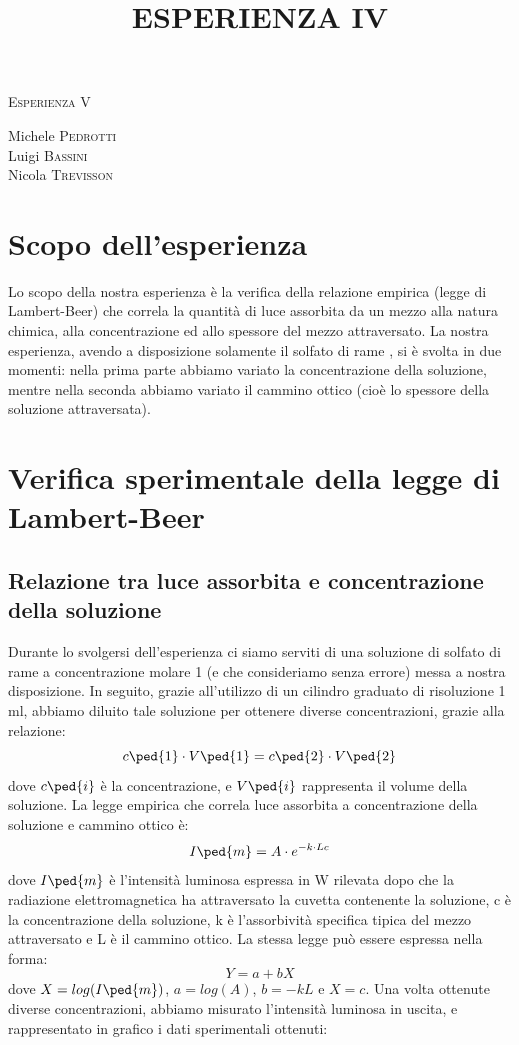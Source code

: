 \documentclass[a4paper,11pt]{article}
\begin{document}
\begin{center}



\textsc{\Huge Esperienza V}\\[0.5cm]



\large
\title{ESPERIENZA IV}

Michele \textsc{Pedrotti}\\
Luigi \textsc{Bassini}\\
Nicola \textsc{Trevisson}\\


\end{center}
\vspace{0.1 cm}
\section{Scopo dell'esperienza}
 Lo scopo della nostra esperienza è la verifica della relazione empirica (legge di Lambert-Beer) che correla la quantità di luce assorbita da un mezzo alla natura chimica, alla concentrazione ed allo spessore del mezzo attraversato. La nostra esperienza, avendo a disposizione solamente il solfato di rame , si è svolta in due momenti: nella prima parte abbiamo variato la concentrazione della soluzione, mentre nella seconda abbiamo variato il cammino ottico (cioè lo spessore della soluzione attraversata).

\section{Verifica sperimentale della legge di Lambert-Beer}
\subsection{Relazione tra luce assorbita e concentrazione della soluzione}
Durante lo svolgersi dell'esperienza ci siamo serviti di una soluzione di solfato di rame a concentrazione molare 1 (e che consideriamo senza errore) messa a nostra disposizione. In seguito, grazie all'utilizzo di un cilindro graduato di risoluzione 1 ml, abbiamo diluito tale soluzione per ottenere diverse concentrazioni, grazie alla relazione: $$c\ped{1}\cdot V\ped{1}=c\ped{2}\cdot V\ped{2}$$ dove $c\ped{i}$ è la concentrazione, e $V\ped{i}$ rappresenta il volume della soluzione. La legge empirica che correla luce assorbita a concentrazione della soluzione e cammino ottico è: $$I\ped{m}=A\cdot e^{-k\cdot Lc}$$
dove $I\ped{m}$ è l'intensità luminosa espressa in W rilevata dopo che la radiazione elettromagnetica ha attraversato la cuvetta contenente la soluzione, c è la concentrazione della soluzione, k è l'assorbività specifica tipica del mezzo attraversato e L è il cammino ottico. La stessa legge può essere espressa nella forma: $$Y=a+bX$$ dove $X=log(I\ped{m})$, $a=log(A)$, $b=-kL$ e $X=c$.
Una volta ottenute diverse concentrazioni, abbiamo misurato l'intensità luminosa in uscita, e rappresentato in grafico i dati sperimentali ottenuti:   
\end{document}
